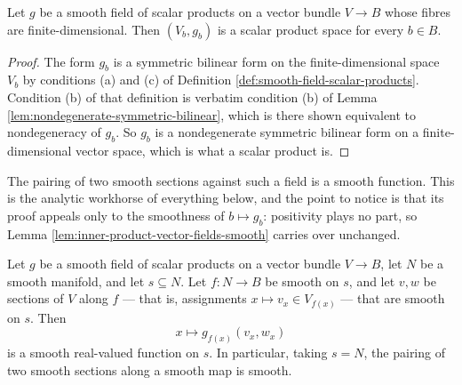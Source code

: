\begin{lemma}
\label{lem:pseudo-metric-fibre-scalar-product}
\leanok
{}
Let $g$ be a smooth field of scalar products on a vector bundle $V \to B$ whose fibres are finite-dimensional. Then $(V_b, g_b)$ is a scalar product space for every $b \in B$.
\end{lemma}

\begin{proof}
\leanok
{}
The form $g_b$ is a symmetric bilinear form on the finite-dimensional space $V_b$ by conditions (a) and (c) of Definition \ref{def:smooth-field-scalar-products}. Condition (b) of that definition is verbatim condition (b) of Lemma \ref{lem:nondegenerate-symmetric-bilinear}, which is there shown equivalent to nondegeneracy of $g_b$. So $g_b$ is a nondegenerate symmetric bilinear form on a finite-dimensional vector space, which is what a scalar product is.
\end{proof}

The pairing of two smooth sections against such a field is a smooth function. This is the analytic workhorse of everything below, and the point to notice is that its proof appeals only to the smoothness of $b \mapsto g_b$: positivity plays no part, so Lemma \ref{lem:inner-product-vector-fields-smooth} carries over unchanged.

\begin{lemma}
\label{lem:pseudo-metric-pairing-smooth}
\leanok
{}
Let $g$ be a smooth field of scalar products on a vector bundle $V \to B$, let $N$ be a smooth manifold, and let $s \subseteq N$. Let $f : N \to B$ be smooth on $s$, and let $v, w$ be sections of $V$ along $f$ — that is, assignments $x \mapsto v_x \in V_{f(x)}$ — that are smooth on $s$. Then
\[
x \longmapsto g_{f(x)}(v_x, w_x)
\]
is a smooth real-valued function on $s$. In particular, taking $s = N$, the pairing of two smooth sections along a smooth map is smooth.
\end{lemma}

